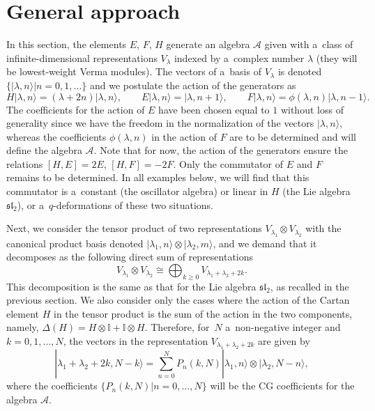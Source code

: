 \documentclass[pdftex]{sigma}
\numberwithin{equation}{section}
\theoremstyle{definition}
\begin{document}
\section{General approach }\label{sec:GA}

In this section, the elements $E$, $F$, $H$
generate an algebra $\mathcal{A}$ given with a~class of infinite-dimensional representations $V_\lambda$ indexed by a~complex number $\lambda$ (they will be lowest-weight Verma modules). The vectors of a~basis of $V_\lambda$ is denoted $\{|\lambda,n\rangle | n=0,1,\dots\}$ and we postulate the action of the generators as
\[H|\lambda,n\rangle=(\lambda+2n)|\lambda,n\rangle, \qquad E|\lambda,n\rangle=|\lambda,n+1\rangle, \qquad F|\lambda,n\rangle=\phi(\lambda,n)|\lambda,n-1\rangle.\]
The coefficients for the action of $E$ have been chosen equal to $1$ without loss of generality since we have the freedom in the normalization of the vectors $|\lambda,n\rangle$, whereas
the coefficients $\phi(\lambda,n)$ in the action of $F$ are to be determined and will define the algebra $\mathcal{A}$. Note that for now, the action of the generators ensure the relations
$[H,E]=2E$, $ [H,F]=-2F$.
Only the commutator of $E$ and $F$ remains to be determined. In all examples below, we will find that this commutator is a~constant (the oscillator algebra) or linear in $H$ (the Lie algebra $\mathfrak{sl}_2$), or a~$q$-deformations of these two situations.

Next, we consider the tensor product of two representations
$V_{\lambda_1}\otimes V_{\lambda_2}$
with the canonical product basis denoted $|\lambda_1,n\rangle\otimes |\lambda_2,m\rangle$, and we demand that
it decomposes as the following direct sum of representations
\[V_{\lambda_1}\otimes V_{\lambda_2}\cong\bigoplus_{k\geq 0} V_{\lambda_1+\lambda_2+2k}.\]
This decomposition is the same as that for the Lie algebra $\mathfrak{sl}_2$, as recalled in the previous section.
We also consider only the cases where the action of the Cartan element $H$ in the tensor product is the sum of the action in the two components, namely, $\Delta(H)=H\otimes \mathbb{I}+\mathbb{I}\otimes H$.
Therefore, for~$N$ a~non-negative integer and $k=0,1,\dots,N$, the vectors in the representation $V_{\lambda_1+\lambda_2+2k}$ are given by
\begin{equation}\label{CG-relation}
|\lambda_1+\lambda_2+2k,N-k\rangle=\sum_{n=0}^N P_n(k,N)|\lambda_1,n\rangle\otimes |\lambda_2,N-n\rangle,
\end{equation}
where the coefficients $\{P_n(k,N) | n=0,\dots,N\}$ will be the CG coefficients for the algebra $\mathcal{A}$.
\end{document}
